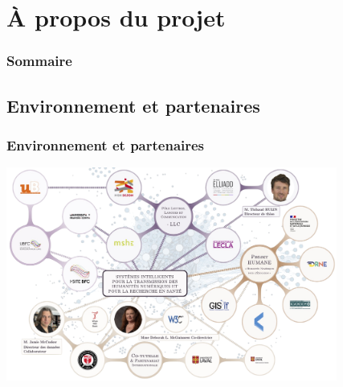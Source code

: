 \documentclass[xcolor=dvipsnames]{beamer}
\begin{document}
\section{À propos du projet}

\begin{frame}
\frametitle{Sommaire}
\tableofcontents[currentsection]
\end{frame}

\subsection{Environnement et partenaires}
\begin{frame}[fragile]
\frametitle{Environnement et partenaires}
\includegraphics[height = 7cm]{images/mindmap.png}
\end{frame}
\end{document}
